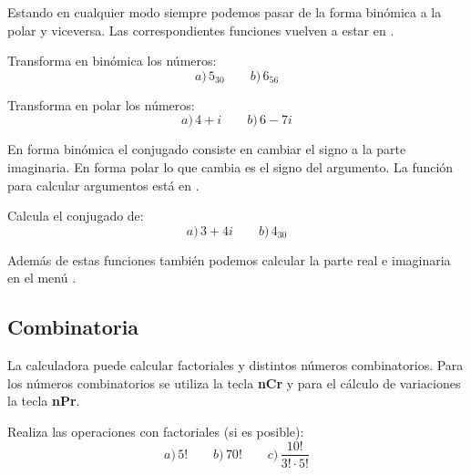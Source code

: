 \documentclass[12pt]{article}
\newcommand{\casiosymbol}[1]{{\footnotesize\casio\symbol{#1}}}
\newenvironment{capitulo}{\begin{tcolorbox}[colback=blue!5!white,colframe=red!75!black]}{\end{tcolorbox}\bigskip}
\newenvironment{ejer}{\begin{tcolorbox}[center title, 
fonttitle=\sffamily\bfseries,colback=blue!5,colframe=orange]}{\end{tcolorbox}}
\begin{document}
Estando en cualquier modo siempre podemos pasar de la forma binómica a la polar y viceversa. Las correspondientes funciones vuelven a estar en \casiosymbol{84}.



\begin{ejer}

Transforma en binómica los números:
\[
a)\,5_{30} \qquad b)\, 6_{56}
\]

\end{ejer}

\begin{ejer}

Transforma en polar los números:
\[
a)\, 4+i \qquad b)\, 6-7i
\]

\end{ejer}



En forma binómica el conjugado consiste en cambiar el signo a la parte imaginaria. En forma polar lo que cambia es el signo del argumento. La función para calcular argumentos está en \casiosymbol{84}.

\begin{ejer}

Calcula el conjugado de:
\[
a)\, 3+4i \qquad b)\, 4_{30}
\]

\end{ejer}

Además de estas funciones también podemos calcular la parte real e imaginaria en el menú \casiosymbol{84}.




\newpage

\begin{capitulo}
\section*{Combinatoria}
\end{capitulo}

La calculadora puede calcular factoriales y distintos números combinatorios. Para los números combinatorios se utiliza la tecla \textbf{nCr} y para el cálculo de variaciones la tecla \textbf{nPr}.


\begin{ejer}

Realiza las operaciones con factoriales (si es posible):
\[
a)\, 5! \qquad b)\, 70! \qquad c)\, \frac{10!}{3! \cdot  5!}
\]

\end{ejer}
\end{document}
